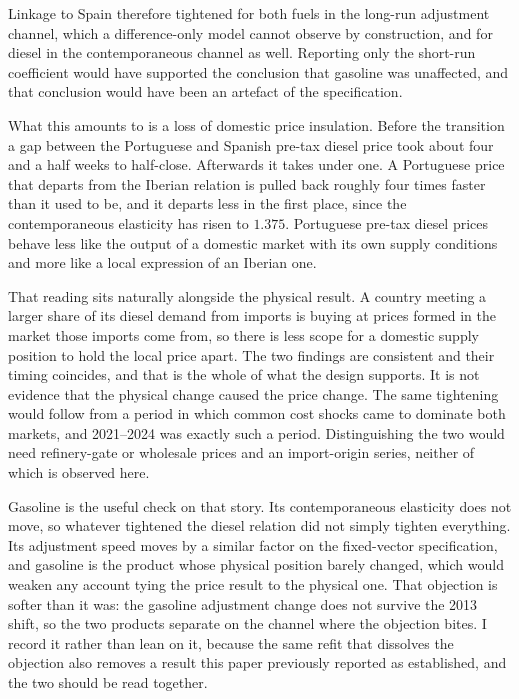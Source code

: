 \documentclass[11pt,a4paper]{article}
\begin{document}
Linkage to Spain therefore tightened for both fuels in the long-run adjustment channel, which a
difference-only model cannot observe by construction, and for diesel in the contemporaneous
channel as well. Reporting only the short-run coefficient would have supported the conclusion
that gasoline was unaffected, and that conclusion would have been an artefact of the
specification.

What this amounts to is a loss of domestic price insulation. Before the transition a gap
between the Portuguese and Spanish pre-tax diesel price took about four and a half weeks to
half-close. Afterwards it takes under one. A Portuguese price that departs from the Iberian
relation is pulled back roughly four times faster than it used to be, and it
departs less in the first place, since the contemporaneous elasticity has risen to $1.375$.
Portuguese pre-tax diesel prices behave less like the output of a domestic market with its own
supply conditions and more like a local expression of an Iberian one.

That reading sits naturally alongside the physical result. A country meeting a larger share of
its diesel demand from imports is buying at prices formed in the market those imports come from,
so there is less scope for a domestic supply position to hold the local price apart. The two
findings are consistent and their timing coincides, and that is the whole of what the design
supports. It is not evidence that the physical change caused the price change. The same
tightening would follow from a period in which common cost shocks came to dominate both markets,
and 2021--2024 was exactly such a period. Distinguishing the two would need refinery-gate or
wholesale prices and an import-origin series, neither of which is observed here.

Gasoline is the useful check on that story. Its contemporaneous elasticity does not move, so
whatever tightened the diesel relation did not simply tighten everything. Its adjustment speed
moves by a similar factor on the fixed-vector specification, and gasoline is the product whose
physical position barely changed, which would weaken any account tying the price result to the
physical one. That objection is softer than it was: the gasoline adjustment change does not
survive the 2013 shift, so the two products separate on the channel where the objection bites.
I record it rather than lean on it, because the same refit that dissolves the objection also
removes a result this paper previously reported as established, and the two should be read
together.
\end{document}
